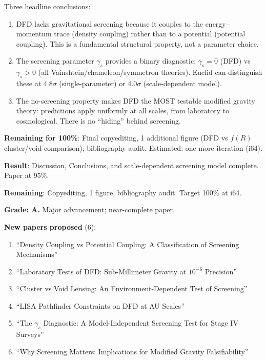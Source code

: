 \documentclass[11pt,a4paper]{article}
\begin{document}
Three headline conclusions:
\begin{enumerate}
\item DFD lacks gravitational screening because it couples to the energy--momentum trace (density coupling) rather than to a potential (potential coupling). This is a fundamental structural property, not a parameter choice.
\item The screening parameter $\gamma_s$ provides a binary diagnostic: $\gamma_s = 0$ (DFD) vs $\gamma_s > 0$ (all Vainshtein/chameleon/symmetron theories). Euclid can distinguish these at $4.8\sigma$ (single-parameter) or $4.0\sigma$ (scale-dependent model).
\item The no-screening property makes DFD the MOST testable modified gravity theory: predictions apply uniformly at all scales, from laboratory to cosmological. There is no ``hiding'' behind screening.
\end{enumerate}

\textbf{Remaining for 100\%}: Final copyediting, 1 additional figure (DFD vs $f(R)$ cluster/void comparison), bibliography audit. Estimated: one more iteration (i64).

\begin{tcolorbox}[colback=green!5!white, colframe=green!60!black, title={Agent 15: No-Screening Paper at 95\%}]
\textbf{Result}: Discussion, Conclusions, and scale-dependent screening model complete. Paper at 95\%.

\textbf{Remaining}: Copyediting, 1 figure, bibliography audit. Target 100\% at i64.

\textbf{Grade: A.} Major advancement; near-complete paper.

\textbf{New papers proposed} (6):
\begin{enumerate}
\item ``Density Coupling vs Potential Coupling: A Classification of Screening Mechanisms''
\item ``Laboratory Tests of DFD: Sub-Millimeter Gravity at $10^{-6}$ Precision''
\item ``Cluster vs Void Lensing: An Environment-Dependent Test of Screening''
\item ``LISA Pathfinder Constraints on DFD at AU Scales''
\item ``The $\gamma_s$ Diagnostic: A Model-Independent Screening Test for Stage IV Surveys''
\item ``Why Screening Matters: Implications for Modified Gravity Falsifiability''
\end{enumerate}
\end{tcolorbox}
\end{document}

